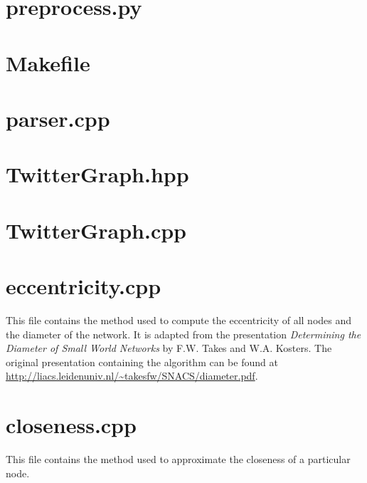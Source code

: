 \documentclass[a4paper,10pt,hidelinks]{article}
\begin{document}
\pagebreak

\appendix

\section{preprocess.py}
\label{lst:preprocess}

\pagebreak

\section{Makefile}

\pagebreak

\section{parser.cpp}



\pagebreak

\section{TwitterGraph.hpp}



\pagebreak

\section{TwitterGraph.cpp}



\pagebreak

\section{eccentricity.cpp}
This file contains the method used to compute the eccentricity of all nodes and the diameter of the network. It is adapted from the presentation \emph{Determining the Diameter of Small World Networks} by F.W. Takes and W.A. Kosters. The original presentation containing the algorithm can be found at \url{http://liacs.leidenuniv.nl/~takesfw/SNACS/diameter.pdf}.



\pagebreak

\section{closeness.cpp}

This file contains the method used to approximate the closeness of a particular node.


\end{document}
